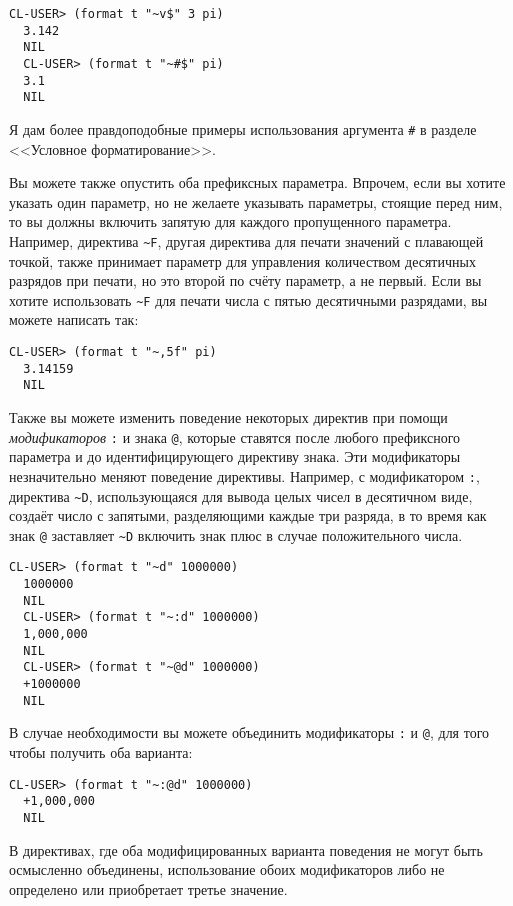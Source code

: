 \begin{lstlisting}[style=lisprepl]
  CL-USER> (format t "~v$" 3 pi)
  3.142
  NIL
  CL-USER> (format t "~#$" pi)
  3.1
  NIL
\end{lstlisting}

Я дам более правдоподобные примеры использования аргумента \lstinline!#! в
разделе <<Условное форматирование>>.

Вы можете также опустить оба префиксных параметра. Впрочем, если вы хотите указать один
параметр, но не желаете указывать параметры, стоящие перед ним, то вы должны включить
запятую для каждого пропущенного параметра. Например, директива \lstinline!~F!, другая
директива для печати значений с плавающей точкой, также принимает параметр для управления
количеством десятичных разрядов при печати, но это второй по счёту параметр, а не
первый. Если вы хотите использовать \lstinline!~F! для печати числа с пятью десятичными
разрядами, вы можете написать так:

\begin{lstlisting}[style=lisprepl]
  CL-USER> (format t "~,5f" pi)
  3.14159
  NIL
\end{lstlisting}

Также вы можете изменить поведение некоторых директив при помощи \textit{модификаторов}
\lstinline!:! и знака \lstinline!@!, которые ставятся после любого префиксного параметра и
до идентифицирующего директиву знака. Эти модификаторы незначительно меняют поведение
директивы. Например, с модификатором \lstinline!:!, директива \lstinline!~D!,
использующаяся для вывода целых чисел в десятичном виде, создаёт число с запятыми,
разделяющими каждые три разряда, в то время как знак \lstinline!@! заставляет
\lstinline!~D!  включить знак плюс в случае положительного числа.

\begin{lstlisting}[style=lisprepl]
  CL-USER> (format t "~d" 1000000)
  1000000
  NIL
  CL-USER> (format t "~:d" 1000000)
  1,000,000
  NIL
  CL-USER> (format t "~@d" 1000000)
  +1000000
  NIL
\end{lstlisting}

В случае необходимости вы можете объединить модификаторы \lstinline!:! и \lstinline!@!,
для того чтобы получить оба варианта:

\begin{lstlisting}[style=lisprepl]
  CL-USER> (format t "~:@d" 1000000)
  +1,000,000
  NIL
\end{lstlisting}

В директивах, где оба модифицированных варианта поведения не могут быть осмысленно
объединены, использование обоих модификаторов либо не определено или приобретает третье
значение.

